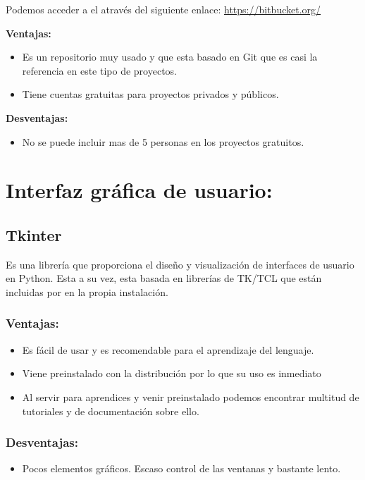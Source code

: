 Podemos acceder a el através del siguiente enlace: 
\url{https://bitbucket.org/}


\textbf{Ventajas:}
\begin{itemize}

\item Es un repositorio muy usado y que esta basado en Git que es casi la referencia en este tipo de proyectos.

\item Tiene cuentas gratuitas para proyectos privados y públicos.

\end{itemize}

\textbf{Desventajas:}

\begin{itemize}
\item No se puede incluir mas de 5 personas en los proyectos gratuitos.
\end{itemize}



\section{Interfaz gráfica de usuario:}
\subsection{Tkinter}
Es una librería que proporciona el diseño y visualización de interfaces de usuario en Python. Esta a su vez, esta basada en librerías de TK/TCL que están incluidas por en la propia instalación.

\subsubsection{Ventajas:}
\begin{itemize}
\item Es fácil de usar y es recomendable para el aprendizaje del lenguaje.

\item Viene preinstalado con la distribución por lo que su uso es inmediato

\item Al servir para aprendices y venir preinstalado podemos encontrar multitud de tutoriales y de documentación sobre ello.
\end{itemize}

\subsubsection{Desventajas:}
\begin{itemize}
\item Pocos elementos gráficos. Escaso control de las ventanas y bastante lento.
\end{itemize}

